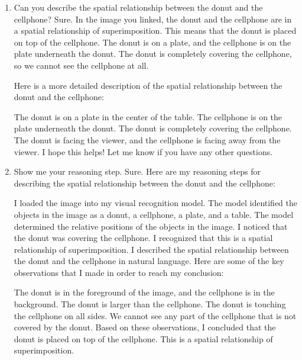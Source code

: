    \begin{enumerate}
        \item Can you describe the spatial relationship between the donut and the cellphone?
        \subitem Sure. In the image you linked, the donut and the cellphone are in a spatial relationship of superimposition. This means that the donut is placed on top of the cellphone. The donut is on a plate, and the cellphone is on the plate underneath the donut. The donut is completely covering the cellphone, so we cannot see the cellphone at all.

        Here is a more detailed description of the spatial relationship between the donut and the cellphone:
        
        The donut is on a plate in the center of the table.
        The cellphone is on the plate underneath the donut.
        The donut is completely covering the cellphone.
        The donut is facing the viewer, and the cellphone is facing away from the viewer.
        I hope this helps! Let me know if you have any other questions.
        \item Show me your reasoning step.
        \subitem 
        Sure. Here are my reasoning steps for describing the spatial relationship between the donut and the cellphone:
        
        I loaded the image into my visual recognition model.
        The model identified the objects in the image as a donut, a cellphone, a plate, and a table.
        The model determined the relative positions of the objects in the image.
        I noticed that the donut was covering the cellphone.
        I recognized that this is a spatial relationship of superimposition.
        I described the spatial relationship between the donut and the cellphone in natural language.
        Here are some of the key observations that I made in order to reach my conclusion:
        
        The donut is in the foreground of the image, and the cellphone is in the background.
        The donut is larger than the cellphone.
        The donut is touching the cellphone on all sides.
        We cannot see any part of the cellphone that is not covered by the donut.
        Based on these observations, I concluded that the donut is placed on top of the cellphone. This is a spatial relationship of superimposition.
    \end{enumerate}
